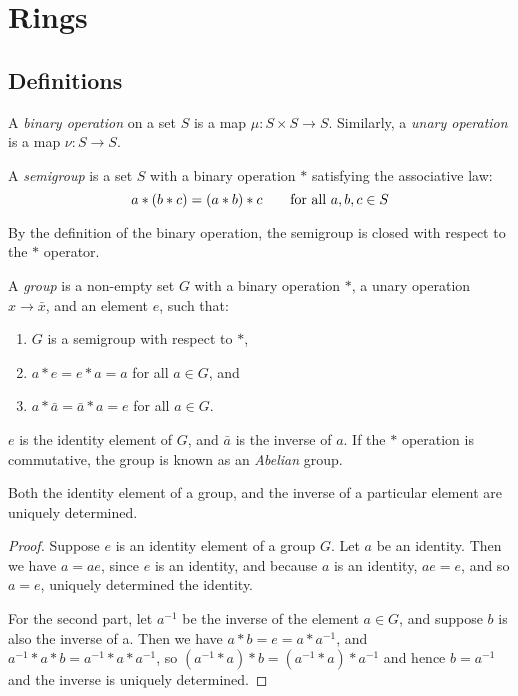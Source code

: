 \section{Rings}

\subsection{Definitions}

  \begin{Def}
    A \emph{binary operation} on a set $S$ is a map $\mu:S \times S \to S$.
    Similarly, a \emph{unary operation} is a map $\nu:S \to S$.
  \end{Def}

  \begin{Def}
    A \emph{semigroup} is a set $S$ with a binary operation $*$ satisfying
    the associative law:
    \[
      a * (b * c) = (a * b) * c \text{\qquad for all } a, b,c \in S
    \]

    By the definition of the binary operation, the semigroup is closed with
    respect to the $*$ operator.

  \end{Def}

  \begin{Def} A \emph{group} is a non-empty set $G$ with a binary
    operation $*$, a unary operation $x \to \bar{x}$,
    and an element $e$, such that:
    \begin{enumerate}[label=(\roman*)]
      \item $G$ is a semigroup with respect to $*$,
      \item $a * e = e * a = a$ for all $a \in G$, and
      \item $a * \bar{a} = \bar{a} * a = e$ for all $a \in G$.
    \end{enumerate}
    $e$ is the identity element of $G$, and $\bar{a}$ is the inverse of $a$.
    If the $*$ operation is commutative, the group is known as an
    \emph{Abelian} group.

  \end{Def}

  \begin{Lemma}
    Both the identity element of a group, and the inverse of a particular
    element are uniquely determined.
  \end{Lemma}

  \begin{proof}
    Suppose $e$ is an identity element of a group $G$. Let $a$ be an identity.
    Then we have $a = ae$, since $e$ is an identity, and because $a$ is an
    identity, $ae = e$, and so $a = e$, uniquely determined the identity.

    For the second part, let $a^{-1}$ be the inverse of the element $a \in G$,
    and suppose $b$ is also the inverse of a. Then we have $a * b = e = a *
    a^{-1}$, and $ a^{-1} * a * b = a^{-1} * a * a^{-1} $, so $ (a^{-1} * a) *
    b = (a^{-1} * a) * a^{-1} $ and hence $b = a^{-1}$ and the inverse is
    uniquely determined.
  \end{proof}

